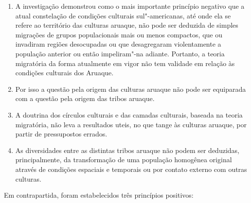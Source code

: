 \begin{enumerate}
\def\labelenumi{\arabic{enumi}.}
\item
  A investigação demonstrou como o mais importante princípio negativo
  que a atual constelação de condições culturais sul"-americanas, até
  onde ela se refere ao território das culturas aruaque, não pode ser
  deduzida de simples migrações de grupos populacionais mais ou menos
  compactos, que ou invadiram regiões desocupadas ou que desagregaram
  violentamente a população anterior ou então impeliram"-na adiante.
  Portanto, a teoria migratória da forma atualmente em vigor não tem
  validade em relação às condições culturais dos Aruaque.
\item
  Por isso a questão pela origem das culturas aruaque não pode ser
  equiparada com a questão pela origem das tribos aruaque.
\item
  A doutrina dos círculos culturais e das camadas culturais, baseada na
  teoria migratória, não leva a resultados uteis, no que tange às
  culturas aruaque, por partir de pressupostos errados.
\item
  As diversidades entre as distintas tribos aruaque não podem ser
  deduzidas, principalmente, da transformação de uma população
  homogênea original através de condições espaciais e temporais ou por
  contato externo com outras culturas.
\end{enumerate}

Em contrapartida, foram estabelecidos três princípios positivos:

